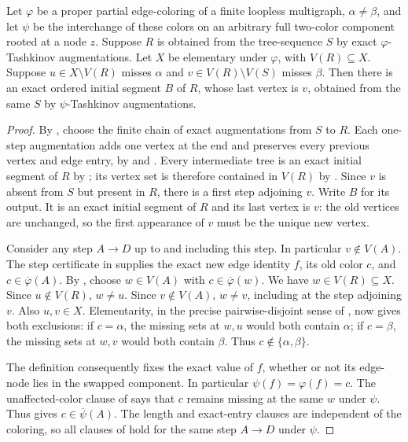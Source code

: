 \begin{helper}
Let $\varphi$ be a proper partial edge-coloring of a finite loopless
multigraph, $\alpha\ne\beta$, and let $\psi$ be the interchange of
these colors on an arbitrary full two-color component rooted at a node
$z$. Suppose $R$ is obtained from the tree-sequence $S$ by exact
$\varphi$-Tashkinov augmentations. Let $X$ be elementary under
$\varphi$, with $V(R)\subseteq X$. Suppose $u\in X\setminus V(R)$
misses $\alpha$ and $v\in V(R)\setminus V(S)$ misses $\beta$.
Then there is an exact ordered initial segment $B$ of $R$, whose last
vertex is $v$, obtained from the same $S$ by $\psi$-Tashkinov
augmentations.
\end{helper}
\begin{proof}
By , choose the finite chain
of exact augmentations from $S$ to $R$. Each one-step augmentation
adds one vertex at the end and preserves every previous vertex and
edge entry, by  and
. Every intermediate tree is an
exact initial segment of $R$ by
; its vertex set
is therefore contained in $V(R)$ by
.
Since $v$ is absent from $S$ but present in $R$, there is a first step
adjoining $v$. Write $B$ for its output. It is an exact initial segment
of $R$ and its last vertex is $v$: the old vertices are unchanged, so
the first appearance of $v$ must be the unique new vertex.

Consider any step $A\longrightarrow D$ up to and including this
step. In particular $v\notin V(A)$. The step certificate in
 supplies the exact new edge identity
$f$, its old color $c$, and $c\in\overline\varphi(A)$.
By , choose $w\in V(A)$ with
$c\in\overline\varphi(w)$. We have $w\in V(R)\subseteq X$.
Since $u\notin V(R)$, $w\ne u$. Since $v\notin V(A)$, $w\ne v$,
including at the step adjoining $v$. Also $u,v\in X$.
Elementarity, in the precise pairwise-disjoint sense of
, now gives both exclusions:
if $c=\alpha$, the missing sets at $w,u$ would both contain
$\alpha$; if $c=\beta$, the missing sets at $w,v$ would both contain
$\beta$. Thus $c\notin\{\alpha,\beta\}$.

The definition  consequently fixes
the exact value of $f$, whether or not its edge-node lies in the
swapped component. In particular $\psi(f)=\varphi(f)=c$.
The unaffected-color clause of
 says that $c$ remains
missing at the same $w$ under $\psi$. Thus
 gives $c\in\overline\psi(A)$.
The length and exact-entry clauses are independent of the coloring,
so all clauses of  hold for the same
step $A\longrightarrow D$ under $\psi$.


\end{proof}
